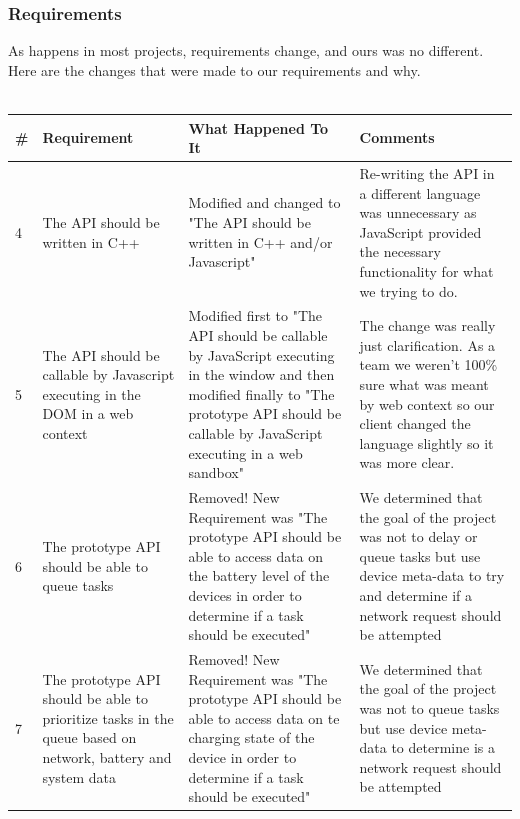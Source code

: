 \documentclass[12pt]{article}
\begin{document}
\subsubsection{Requirements}
As happens in most projects, requirements change, and ours was no different. Here are the changes that were made to our requirements and why.\\\\
\begin{tabularx}{\textwidth}{|p{1cm}|X|X|X|}
\hline
\#  & Requirement 				& What Happened To It & Comments \\ \hline
4 & The API should be written in C++ & Modified and changed to "The API should be written in C++ and/or Javascript" & Re-writing the API in a different language was unnecessary as JavaScript provided the necessary functionality for what we trying to do. \\ \hline
5 & The API should be callable by Javascript executing in the DOM in a web context & Modified first to "The API should be callable by JavaScript executing in the window and then modified finally to "The prototype API should be callable by JavaScript executing in a web sandbox" & The change was really just clarification.  As a team we weren't 100\% sure what was meant by web context so our client changed the language slightly so it was more clear. \\ \hline
6 & The prototype API should be able to queue tasks & Removed! New Requirement was "The prototype API should be able to access data on the battery level of the devices in order to determine if a task should be executed" & We determined that the goal of the project was not to delay or queue tasks but use device meta-data to try and determine if a network request should be attempted \\ \hline
7 & The prototype API should be able to prioritize tasks in the queue based on network, battery and system data & Removed! New Requirement was "The prototype API should be able to access data on te charging state of the device in order to determine if a task should be executed" & We determined that the goal of the project was not to queue tasks but use device meta-data to determine is a network request should be attempted \\ \hline
\end{tabularx}
\pagebreak
\end{document}
